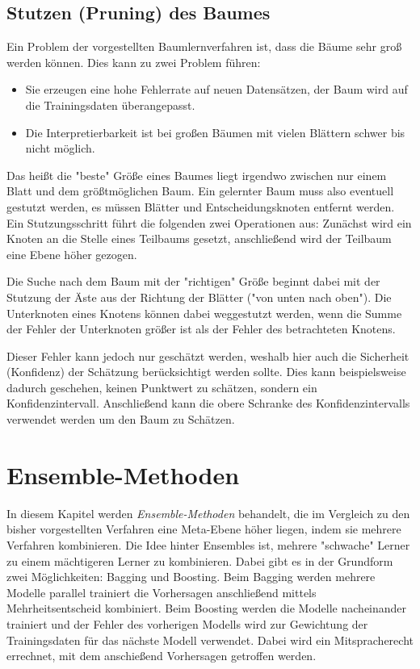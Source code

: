 	\section{Stutzen (Pruning) des Baumes}
		Ein Problem der vorgestellten Baumlernverfahren ist, dass die Bäume sehr groß werden können. Dies kann zu zwei Problem führen:
		\begin{itemize}
			\item Sie erzeugen eine hohe Fehlerrate auf neuen Datensätzen, \dh der Baum wird auf die Trainingsdaten überangepasst.
			\item Die Interpretierbarkeit ist bei großen Bäumen mit vielen Blättern schwer bis nicht möglich.
		\end{itemize}
		Das heißt die "beste" Größe eines Baumes liegt irgendwo zwischen nur einem Blatt und dem größtmöglichen Baum. Ein gelernter Baum muss also eventuell gestutzt werden, \dh es müssen Blätter und Entscheidungsknoten entfernt werden. Ein Stutzungsschritt führt die folgenden zwei Operationen aus: Zunächst wird ein Knoten an die Stelle eines Teilbaums gesetzt, anschließend wird der Teilbaum eine Ebene höher gezogen.

		Die Suche nach dem Baum mit der "richtigen" Größe beginnt dabei mit der Stutzung der Äste aus der Richtung der Blätter ("von unten nach oben"). Die Unterknoten eines Knotens können dabei weggestutzt werden, wenn die Summe der Fehler der Unterknoten größer ist als der Fehler des betrachteten Knotens.

		Dieser Fehler kann jedoch nur geschätzt werden, weshalb hier auch die Sicherheit (Konfidenz) der Schätzung berücksichtigt werden sollte. Dies kann beispielsweise dadurch geschehen, keinen Punktwert zu schätzen, sondern ein Konfidenzintervall. Anschließend kann die obere Schranke des Konfidenzintervalls verwendet werden um den Baum zu Schätzen.


\chapter{Ensemble-Methoden}
	In diesem Kapitel werden \emph{Ensemble-Methoden} behandelt, die im Vergleich zu den bisher vorgestellten Verfahren eine Meta-Ebene höher liegen, indem sie mehrere Verfahren kombinieren. Die Idee hinter Ensembles ist, mehrere "schwache" Lerner zu einem mächtigeren Lerner zu kombinieren. Dabei gibt es in der Grundform zwei Möglichkeiten: Bagging und Boosting. Beim Bagging werden mehrere Modelle parallel trainiert die Vorhersagen anschließend \bspw mittels Mehrheitsentscheid kombiniert. Beim Boosting werden die Modelle nacheinander trainiert und der Fehler des vorherigen Modells wird zur Gewichtung der Trainingsdaten für das nächste Modell verwendet. Dabei wird ein Mitspracherecht errechnet, mit dem anschießend Vorhersagen getroffen werden.


